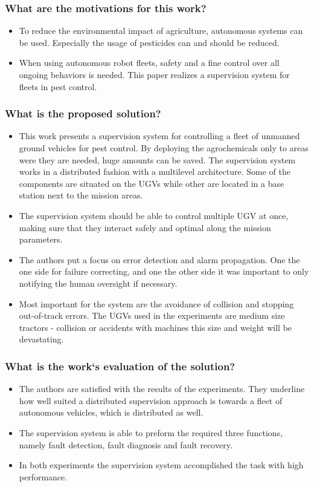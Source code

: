      
    \subsubsection*{What are the motivations for this work?}
    \begin{itemize}
        \item To reduce the environmental impact of agriculture, autonomous systems can be used. Especially the usage of pesticides can and should be reduced. 
        \item When using autonomous robot fleets, safety and a fine control over all ongoing behaviors is needed. This paper realizes a supervision system for fleets in pest control.
    \end{itemize}
    \subsubsection*{What is the proposed solution?}
    \begin{itemize}
        \item  This work presents a supervision system for controlling a fleet of unmanned ground vehicles for pest control. By deploying the agrochemicals only to areas were they are needed, huge amounts can be saved. The supervision system works in a distributed fashion with a multilevel architecture. Some of the components are situated on the UGVs while other are located in a base station next to the mission areas.
        \item The supervision system should be able to control multiple UGV at once, making sure that they interact safely and optimal along the mission parameters.  
        \item The authors put a focus on error detection and alarm propagation. One the one side for failure correcting, and one the other side it was important to only notifying the human oversight if necessary. 
        \item Most important for the system are the avoidance of collision and stopping out-of-track errors. The UGVs used in the experiments are medium size tractors - collision or accidents with machines this size and weight will be devastating.
    \end{itemize}
    \subsubsection*{What is the work`s evaluation of the solution?}
    \begin{itemize}
        \item The authors are satisfied with the results of the experiments. They underline how well suited a distributed supervision approach is towards a fleet of autonomous vehicles, which is distributed as well.
        \item The supervision system is able to preform the required three functions, namely fault detection, fault diagnosis and fault recovery.
        \item In both experiments the supervision system accomplished the task with high performance.
    \end{itemize}
